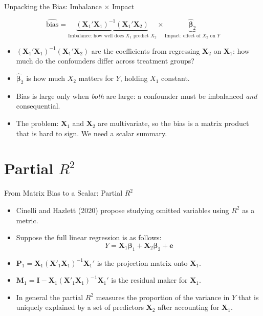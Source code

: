 \documentclass[aspectratio=169, handout, t]{beamer}
\numberwithin{equation}{section}
\begin{document}
\begin{frame}{Unpacking the Bias: Imbalance $\times$ Impact}

$$\widehat{\text{bias}} = \underbrace{(\bm{X}_1'\bm{X}_1)^{-1}(\bm{X}_1'\bm{X}_2)}_{\text{Imbalance: how well does }X_1\text{ predict }X_2}\times\underbrace{\bm{\hat{\beta}}_2}_{\text{Impact: effect of }X_2\text{ on }Y}$$
\begin{itemize}
\item $(\bm{X}_1'\bm{X}_1)^{-1}(\bm{X}_1'\bm{X}_2)$ are the coefficients from regressing $\bm{X}_2$ on $\bm{X}_1$: how much do the confounders differ across treatment groups?\pause
\item $\bm{\hat{\beta}}_2$ is how much $X_2$ matters for $Y$, holding $X_1$ constant.\pause
\item Bias is large only when \emph{both} are large: a confounder must be imbalanced \emph{and} consequential.\pause
\item The problem: $\bm{X}_1$ and $\bm{X}_2$ are multivariate, so the bias is a matrix product that is hard to sign. We need a scalar summary.
\end{itemize}
\end{frame}

\section{Partial \texorpdfstring{$R^2$}{R-squared}}

\begin{frame}{From Matrix Bias to a Scalar: Partial $R^2$}
\begin{itemize}
\item Cinelli and Hazlett (2020) propose studying omitted variables using $R^2$ as a metric.
\item Suppose the full linear regression is as follows:
$$Y=\bm{X}_1\bm{\beta}_1+\bm{X}_2\bm{\beta}_2+\bm{e}$$
\item $\bm{P}_1=\bm{X}_1(\bm{X}'_1\bm{X}_1)^{-1}\bm{X}_1'$ is the projection matrix onto $\bm{X}_1$.
\item $\bm{M}_1=\bm{I}-\bm{X}_1(\bm{X}'_1\bm{X}_1)^{-1}\bm{X}_1'$ is the residual maker for $\bm{X}_1$.
\item In general the partial $R^2$ measures the proportion of the variance in $Y$ that is uniquely explained by a set of predictors $\bm{X}_2$ after accounting for $\bm{X}_1$.
\end{itemize}
\end{frame}
\end{document}
